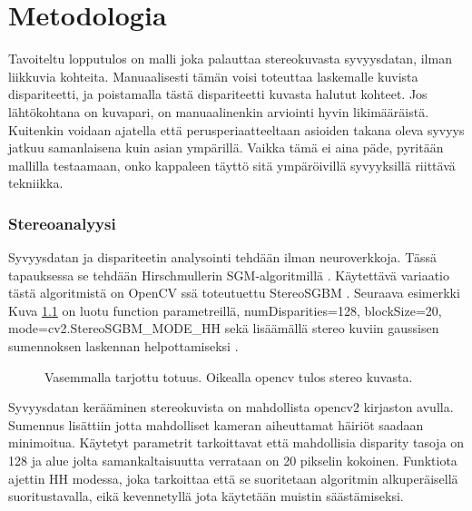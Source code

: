 \chapter{Metodologia}
\label{ch:metodologia}

Tavoiteltu lopputulos on malli joka palauttaa stereokuvasta syvyysdatan, ilman liikkuvia kohteita.
Manuaalisesti tämän voisi toteuttaa laskemalle kuvista dispariteetti, ja poistamalla tästä dispariteetti kuvasta halutut kohteet.
Jos lähtökohtana on kuvapari, on manuaalinenkin arviointi hyvin likimääräistä. Kuitenkin voidaan ajatella että perusperiaatteeltaan asioiden takana oleva syvyys jatkuu samanlaisena kuin asian ympärillä.
Vaikka tämä ei aina päde, pyritään mallilla testaamaan, onko kappaleen täyttö sitä ympäröivillä syvyyksillä riittävä tekniikka.

\subsection{Stereoanalyysi}

Syvyysdatan ja dispariteetin analysointi tehdään ilman neuroverkkoja.
Tässä tapauksessa se tehdään Hirschmullerin SGM-algoritmillä \cite{hirschmuller2005babel}.
Käytettävä variaatio tästä algoritmistä on OpenCV ssä toteutuettu StereoSGBM \cite{opencvsgbm}.
Seuraava esimerkki Kuva  \ref{fig:disparity1} on luotu function parametreillä, numDisparities=128, blockSize=20, mode=cv2.StereoSGBM\_MODE\_HH
sekä lisäämällä stereo kuviin gaussisen sumennoksen laskennan helpottamiseksi \cite{AnShiyong2021Asvs}.

\begin{figure}[h]
\centering
{}
\caption[Tämä on lyhyt kuvateksti.]{Vasemmalla tarjottu totuus. Oikealla opencv tulos stereo kuvasta.}
\label{fig:disparity1}
\end{figure}
    
Syvyysdatan kerääminen stereokuvista on mahdollista opencv2 kirjaston avulla.
Sumennus lisättiin jotta mahdolliset kameran aiheuttamat häiriöt saadaan minimoitua.
Käytetyt parametrit tarkoittavat että mahdollisia disparity tasoja on 128 ja alue jolta samankaltaisuutta verrataan on 20 pikselin kokoinen.
Funktiota ajettin HH modessa, joka tarkoittaa että se suoritetaan algoritmin alkuperäisellä suoritustavalla, 
eikä kevennetyllä jota käytetään muistin säästämiseksi.

